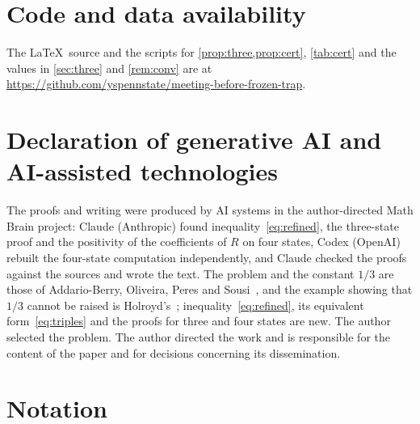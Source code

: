 \documentclass[11pt,a4paper]{article}
\numberwithin{equation}{section}
\theoremstyle{remark}
\begin{document}
\section*{Code and data availability}
The \LaTeX\ source and the scripts for \cref{prop:three,prop:cert}, \cref{tab:cert} and the values in \cref{sec:three} and \cref{rem:conv} are at \url{https://github.com/yspennstate/meeting-before-frozen-trap}.

\section*{Declaration of generative AI and AI-assisted technologies}
The proofs and writing were produced by AI systems in the author-directed Math Brain project: Claude (Anthropic) found inequality~\eqref{eq:refined}, the three-state proof and the positivity of the coefficients of $R$ on four states, Codex (OpenAI) rebuilt the four-state computation independently, and Claude checked the proofs against the sources and wrote the text. The problem and the constant $1/3$ are those of Addario-Berry, Oliveira, Peres and Sousi~\cite{ABOPS}, and the example showing that $1/3$ cannot be raised is Holroyd's~\cite[Section~6]{ABOPS}; inequality~\eqref{eq:refined}, its equivalent form~\eqref{eq:triples} and the proofs for three and four states are new. The author selected the problem. The author directed the work and is responsible for the content of the paper and for decisions concerning its dissemination.

\appendix
\section{Notation}\label{app:notation}
\end{document}
